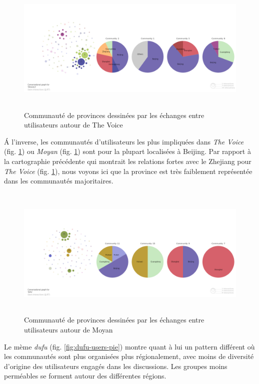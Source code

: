 \begin{figure}[h!]
    \centering
    \includegraphics[width=5.9996in,height=2.5004in]{figures/chap4/chapitre4-img56.png}
    \caption{
        Communauté de provinces dessinées par les échanges entre utilisateurs autour de The Voice
    }
    \label{fig:voice-users-pie}
\end{figure}

\'A l{\textquoteright}inverse, les communautés d{\textquoteright}utilisateurs les plus impliquées dans \textit{The Voice} (fig. \ref{fig:voice-users-pie}) ou \textit{Moyan} (fig. \ref{fig:voice-users-pie}) sont pour la plupart localisées \`a Beijing. Par rapport \`a la cartographie précédente qui montrait les relations fortes avec le Zhejiang pour \textit{The Voice} (fig. \ref{fig:voice-users-pie}), nous voyons ici que la province est très faiblement représentée dans les communautés majoritaires. 

\begin{figure}[h!]
  \centering
   \includegraphics[width=5.9996in,height=2.5004in]{figures/chap4/chapitre4-img57.png}
    \caption{
        Communauté de provinces dessinées par les échanges entre utilisateurs autour de Moyan
    }
    \label{fig:moyan-users-pie}
\end{figure}

Le mème \textit{dufu} (fig. \ref{fig:dufu-users-pie}) montre quant \`a lui un pattern différent o\`u les communautés sont plus organisées plus régionalement, avec moins de diversité d{\textquoteright}origine des utilisateurs engagés dans les discussions. Les groupes moins perméables se forment autour des différentes régions.

